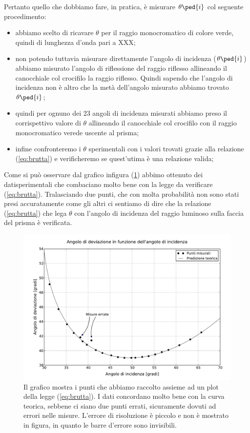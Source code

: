 Pertanto quello che dobbiamo fare, in pratica, è misurare $\theta\ped{i}$ col seguente procedimento:

\begin{itemize}
	\item{abbiamo scelto di ricavare $\theta$ per il raggio monocromatico di colore verde, quindi di lunghezza d'onda pari a XXX;}
	\item{non potendo tuttavia misurare direttamente l'angolo di incidenza ($\theta\ped{i}$) abbiamo misurato l'angolo di riflessione del raggio riflesso allineando il canocchiale col crocifilo la raggio riflesso. Quindi sapendo che l'angolo di incidenza non è altro che la metà dell'angolo misurato abbiamo trovato $\theta\ped{i}$;}
	\item{quindi per ognuno dei 23 angoli di incidenza misurati abbiamo preso il corrispettivo valore di $\theta$ allineando il canocchiale col crocifilo con il raggio monocromatico verede uscente al prisma;}
	\item{infine confronteremo i $\theta$ sperimentali con i valori trovati grazie alla relazione (\ref{eq:brutta}) e verificheremo se quest'utima è una relazione valida;}
\end{itemize}

Come si può osservare dal grafico infigura (\ref{fig:dev}) abbimo ottenuto dei datisperimentali che combaciano molto bene con la legge da verificare (\ref{eq:brutta}). Tralasciando due punti, che con molta probabilità non sono stati presi accuratamente come gli altri ci sentiamo di dire che la relazione (\ref{eq:brutta}) che lega $\theta$ con l'angolo di incidenza del raggio luminoso sulla faccia del prisma è verificata.

\begin{figure}[b]
    \includegraphics[width=16cm]{graph.pdf}
    \caption{Il grafico mostra i punti che abbiamo raccolto assieme ad un plot della legge (\ref{eq:brutta}). I dati concordano
    molto bene con la curva teorica, sebbene ci siano due punti errati, sicuramente dovuti ad errori nelle misure. L'errore di
    risoluzione è piccolo e non è mostrato in figura, in quanto le barre d'errore sono invisibili.}
    \label{fig:dev}
\end{figure}


